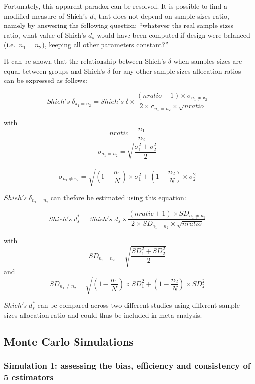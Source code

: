 \documentclass[
  man,floatsintext]{apa6}
\begin{document}
Fortunately, this apparent paradox can be resolved. It is possible to find a modified measure of Shieh's \(d_s\) that does not depend on sample sizes ratio, namely by answering the following question: \enquote{whatever the real sample sizes ratio, what value of Shieh's \(d_s\) would have been computed if design were balanced (i.e.~\(n_1 = n_2\)), keeping all other parameters constant?}

It can be shown that the relationship between Shieh's \(\delta\) when samples sizes are equal between groups and Shieh's \(\delta\) for any other sample sizes allocation ratios can be expressed as follows:

\begin{equation} 
Shieh's \; \delta_{n_1=n_2}= Shieh's \; \delta \times \frac{(nratio+1) \times \sigma_{n_1 \neq n_2}}{2 \times \sigma_{n_1=n_2} \times \sqrt{nratio}}
\label{eq:shiehvsbaldesignPOP}
\end{equation}

with \[nratio= \frac{n_1}{n_2}\]
\[\sigma_{n_1=n_2}= \sqrt{\frac{\sigma_1^2+\sigma_2^2}{2}}\]\\
\[\sigma_{n_1 \neq n_2} = \sqrt{(1- \frac{n_1}{N}) \times \sigma_1^2+(1- \frac{n_2}{N}) \times \sigma_2^2}\]

\(Shieh's \; \delta_{n_1=n_2}\) can thefore be estimated using this equation:

\begin{equation} 
Shieh's \; d^*_s= Shieh's \; d_s \times \frac{(nratio+1) \times SD_{n_1 \neq n_2}}{2 \times SD_{n_1=n_2} \times \sqrt{nratio}}
\label{eq:shiehvsbaldesign}
\end{equation}

with \[SD_{n_1=n_2}= \sqrt{\frac{SD_1^2+SD_2^2}{2}}\] and
\[SD_{n_1 \neq n_2} = \sqrt{(1- \frac{n_1}{N}) \times SD_1^2+(1- \frac{n_2}{N}) \times SD_2^2}\]

\(Shieh's \; d^*_s\) can be compared across two different studies using different sample sizes allocation ratio and could thus be included in meta-analysis.

\hypertarget{monte-carlo-simulations}{%
\subsection{Monte Carlo Simulations}\label{monte-carlo-simulations}}

\hypertarget{simulation-1-assessing-the-bias-efficiency-and-consistency-of-5-estimators}{%
\subsubsection{Simulation 1: assessing the bias, efficiency and consistency of 5 estimators}\label{simulation-1-assessing-the-bias-efficiency-and-consistency-of-5-estimators}}
\end{document}
